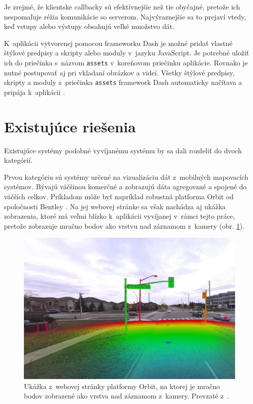 Je zrejmé, že klientske callbacky sú efektívnejšie než tie obyčajné, pretože ich nespomaľuje réžia komunikácie so serverom. Najvýraznejšie sa to prejaví vtedy, keď vstupy alebo výstupy obsahujú veľké množstvo dát.

K~aplikácii vytvorenej pomocou frameworku Dash je možné pridať vlastné štýlové predpisy a skripty alebo moduly v~jazyku JavaScript. Je potrebné uložiť ich do priečinka s~názvom \texttt{assets} v~koreňovom priečinku aplikácie. Rovnako je nutné postupovať aj pri vkladaní obrázkov a videí. Všetky štýlové predpisy, skripty a moduly z~priečinka \texttt{assets} framework Dash automaticky načítava a pripája k~aplikácii \cite{dash_documentation}.

\section{Existujúce riešenia}
\label{sec:existujuce_riesenia}

Existujúce systémy podobné vyvíjanému systému by sa dali rozdeliť do dvoch kategórií.

Prvou kategóriu sú systémy určené na vizualizáciu dát z~mobilných mapovacích systémov. Bývajú väčšinou komerčné a zobrazujú dáta agregované a spojené do väčších celkov. Príkladom môže byť napríklad robustná platforma Orbit od spoločnosti Bentley \cite{orbit}. Na jej webovej stránke sa však nachádza aj ukážka zobrazenia, ktoré má veľmi blízko k~aplikácii vyvíjanej v~rámci tejto práce, pretože zobrazuje mračno bodov ako vrstvu nad záznamom z~kamery (obr. \ref{fig:orbit}).

\begin{figure}[h]
    \centering
    \includegraphics[width=0.6\linewidth]{text_prace/obrazky-figures/Orbit.jpg}
    \caption[Ukážka z~webovej stránky platformy Orbit.]{Ukážka z~webovej stránky platformy Orbit, na ktorej je mračno bodov zobrazené ako vrstva nad záznamom z~kamery. Prevzaté z~\cite{orbit}.}
    \label{fig:orbit}
\end{figure}

